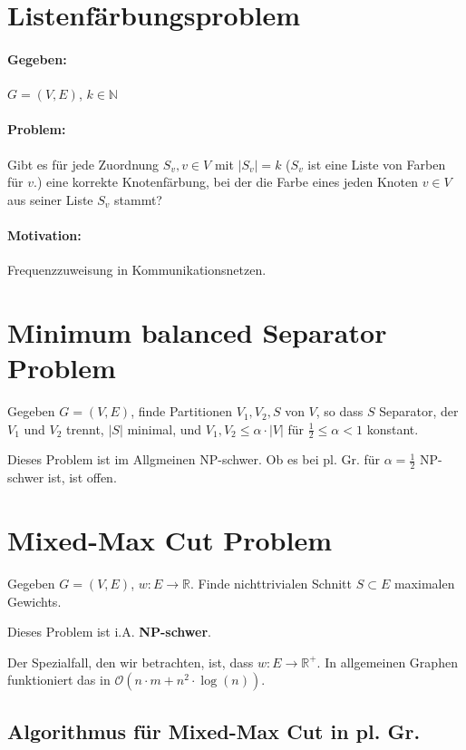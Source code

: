 \documentclass[a4paper,11pt]{report}
\begin{document}
\section{Listenfärbungsproblem}
\paragraph{Gegeben:} $G = (V, E)$, $k \in \mathbb{N}$

\paragraph{Problem:} Gibt es für jede Zuordnung $S_v, v \in V$ mit $|S_v| = k$ ($S_v$ ist eine Liste von Farben für $v$.) eine korrekte Knotenfärbung, bei der die Farbe eines jeden Knoten $v \in V$ aus seiner Liste $S_v$ stammt?

\paragraph{Motivation:} Frequenzzuweisung in Kommunikationsnetzen.


\section{Minimum balanced Separator Problem}
Gegeben $G = (V, E)$, finde Partitionen $V_1, V_2, S$ von $V$, so dass $S$ Separator, der $V_1$ und $V_2$ trennt, $|S|$ minimal, und $V_1, V_2 \leq \alpha \cdot |V|$ für $\frac{1}{2} \leq \alpha < 1$ konstant.

Dieses Problem ist im Allgmeinen NP-schwer. Ob es bei pl. Gr. für $\alpha = \frac{1}{2}$ NP-schwer ist, ist offen.


\section{Mixed-Max Cut Problem}
Gegeben $G = (V, E)$, $w : E \rightarrow \mathbb{R}$. Finde nichttrivialen Schnitt $S \subset E$ maximalen Gewichts.

Dieses Problem ist i.A. {\bf NP-schwer}.

Der Spezialfall, den wir betrachten, ist, dass $w : E \rightarrow \mathbb{R}^+$. In allgemeinen Graphen funktioniert das in $\mathcal{O}(n \cdot m + n^2 \cdot \log(n))$.


\subsection{Algorithmus für Mixed-Max Cut in pl. Gr.}
\end{document}
